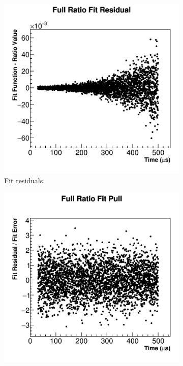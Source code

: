 	\begin{figure}[h]
	\centering
	    \begin{subfigure}[]{0.45\textwidth}
		    \centering
			\includegraphics[width=\textwidth]{fitResidual}
		    \caption{Fit residuals.}
	    \end{subfigure}
	    \begin{subfigure}[]{0.45\textwidth}
		    \centering
			\includegraphics[width=\textwidth]{fitPull}

\end{subfigure}
\end{figure}
